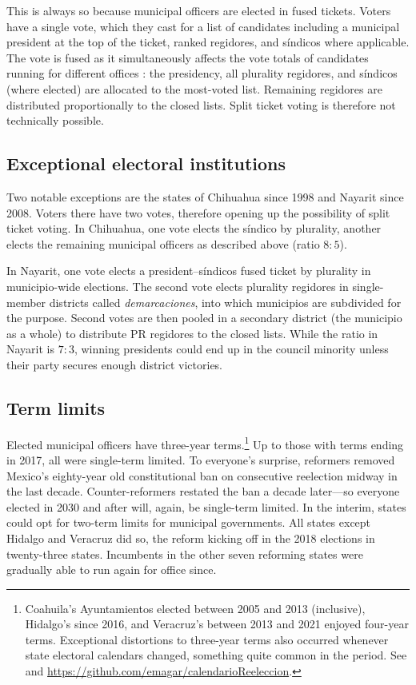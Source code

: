 \documentclass[letter,12pt]{article}
\begin{document}
This is always so because municipal officers are elected in fused tickets. Voters have a single vote, which they cast for a list of candidates including a municipal president at the top of the ticket, ranked regidores, and síndicos where applicable. The vote is fused as it simultaneously affects the vote totals of candidates running for different offices \citep[see ][:42]{cox.1997}: the presidency, all plurality regidores, and síndicos (where elected) are allocated to the most-voted list. Remaining regidores are distributed proportionally to the closed lists. Split ticket voting is therefore not technically possible.

\subsection{Exceptional electoral institutions}
Two notable exceptions are the states of Chihuahua since 1998 and Nayarit since 2008. Voters there have two votes, therefore opening up the possibility of split ticket voting. In Chihuahua, one vote elects the síndico by plurality, another elects the remaining municipal officers as described above (ratio $8:5$).

In Nayarit, one vote elects a president--síndicos fused ticket by plurality in municipio-wide elections. The second vote elects plurality regidores in single-member districts called \emph{demarcaciones}, into which municipios are subdivided for the purpose. Second votes are then pooled in a secondary district (the municipio as a whole) to distribute PR regidores to the closed lists. While the ratio in Nayarit is $7:3$, winning presidents could end up in the council minority unless their party secures enough district victories.

\subsection{Term limits}
Elected municipal officers have three-year terms.\footnote{Coahuila's Ayuntamientos elected between 2005 and 2013 (inclusive), Hidalgo's since 2016, and Veracruz's between 2013 and 2021 enjoyed four-year terms. Exceptional distortions to three-year terms also occurred whenever state electoral calendars changed, something quite common in the period. See \citet{magarInstReel.2017} and \url{https://github.com/emagar/calendarioReeleccion}.} Up to those with terms ending in 2017, all were single-term limited. To everyone's surprise, reformers removed Mexico's eighty-year old constitutional ban on consecutive reelection midway in the last decade. Counter-reformers restated the ban a decade later---so everyone elected in 2030 and after will, again, be single-term limited. In the interim, states could opt for two-term limits for municipal governments. All states except Hidalgo and Veracruz did so, the reform kicking off in the 2018 elections in twenty-three states. Incumbents in the other seven reforming states were gradually able to run again for office since.
\end{document}
